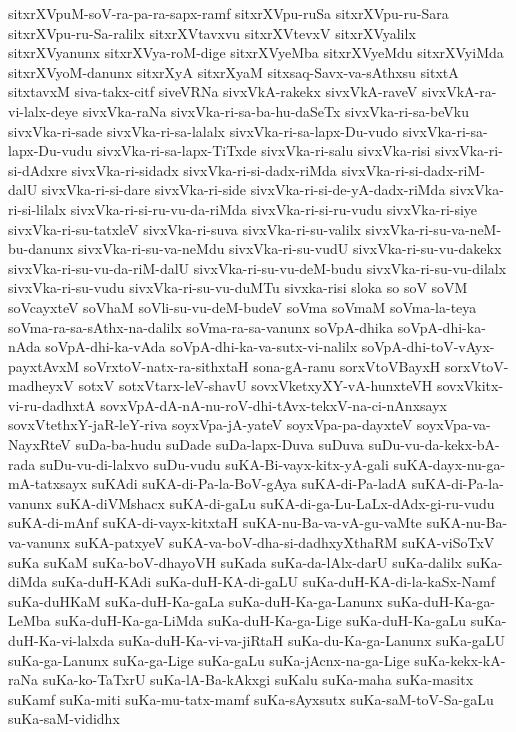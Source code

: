 {sitxrXVpuM-soV-ra-pa-ra-sapx-ramf
sitxrXVpu-ruSa
sitxrXVpu-ru-Sara
sitxrXVpu-ru-Sa-ralilx
sitxrXVtavxvu
sitxrXVtevxV
sitxrXVyalilx
sitxrXVyanunx
sitxrXVya-roM-dige
sitxrXVyeMba
sitxrXVyeMdu
sitxrXVyiMda
sitxrXVyoM-danunx
sitxrXyA
sitxrXyaM
sitxsaq-Savx-va-sAthxsu
sitxtA
sitxtavxM
siva-takx-citf
siveVRNa
sivxVkA-rakekx
sivxVkA-raveV
sivxVkA-ra-vi-lalx-deye
sivxVka-raNa
sivxVka-ri-sa-ba-hu-daSeTx
sivxVka-ri-sa-beVku
sivxVka-ri-sade
sivxVka-ri-sa-lalalx
sivxVka-ri-sa-lapx-Du-vudo
sivxVka-ri-sa-lapx-Du-vudu
sivxVka-ri-sa-lapx-TiTxde
sivxVka-ri-salu
sivxVka-risi
sivxVka-ri-si-dAdxre
sivxVka-ri-sidadx
sivxVka-ri-si-dadx-riMda
sivxVka-ri-si-dadx-riM-dalU
sivxVka-ri-si-dare
sivxVka-ri-side
sivxVka-ri-si-de-yA-dadx-riMda
sivxVka-ri-si-lilalx
sivxVka-ri-si-ru-vu-da-riMda
sivxVka-ri-si-ru-vudu
sivxVka-ri-siye
sivxVka-ri-su-tatxleV
sivxVka-ri-suva
sivxVka-ri-su-valilx
sivxVka-ri-su-va-neM-bu-danunx
sivxVka-ri-su-va-neMdu
sivxVka-ri-su-vudU
sivxVka-ri-su-vu-dakekx
sivxVka-ri-su-vu-da-riM-dalU
sivxVka-ri-su-vu-deM-budu
sivxVka-ri-su-vu-dilalx
sivxVka-ri-su-vudu
sivxVka-ri-su-vu-duMTu
sivxka-risi
sloka
so
soV
soVM
soVcayxteV
soVhaM
soVli-su-vu-deM-budeV
soVma
soVmaM
soVma-la-teya
soVma-ra-sa-sAthx-na-dalilx
soVma-ra-sa-vanunx
soVpA-dhika
soVpA-dhi-ka-nAda
soVpA-dhi-ka-vAda
soVpA-dhi-ka-va-sutx-vi-nalilx
soVpA-dhi-toV-vAyx-payxtAvxM
soVrxtoV-natx-ra-sithxtaH
sona-gA-ranu
sorxVtoVBayxH
sorxVtoV-madheyxV
sotxV
sotxVtarx-leV-shavU
sovxVketxyXY-vA-hunxteVH
sovxVkitx-vi-ru-dadhxtA
sovxVpA-dA-nA-nu-roV-dhi-tAvx-tekxV-na-ci-nAnxsayx
sovxVtethxY-jaR-leY-riva
soyxVpa-jA-yateV
soyxVpa-pa-dayxteV
soyxVpa-va-NayxRteV
suDa-ba-hudu
suDade
suDa-lapx-Duva
suDuva
suDu-vu-da-kekx-bA-rada
suDu-vu-di-lalxvo
suDu-vudu
suKA-Bi-vayx-kitx-yA-gali
suKA-dayx-nu-ga-mA-tatxsayx
suKAdi
suKA-di-Pa-la-BoV-gAya
suKA-di-Pa-ladA
suKA-di-Pa-la-vanunx
suKA-diVMshacx
suKA-di-gaLu
suKA-di-ga-Lu-LaLx-dAdx-gi-ru-vudu
suKA-di-mAnf
suKA-di-vayx-kitxtaH
suKA-nu-Ba-va-vA-gu-vaMte
suKA-nu-Ba-va-vanunx
suKA-patxyeV
suKA-va-boV-dha-si-dadhxyXthaRM
suKA-viSoTxV
suKa
suKaM
suKa-boV-dhayoVH
suKada
suKa-da-lAlx-darU
suKa-dalilx
suKa-diMda
suKa-duH-KAdi
suKa-duH-KA-di-gaLU
suKa-duH-KA-di-la-kaSx-Namf
suKa-duHKaM
suKa-duH-Ka-gaLa
suKa-duH-Ka-ga-Lanunx
suKa-duH-Ka-ga-LeMba
suKa-duH-Ka-ga-LiMda
suKa-duH-Ka-ga-Lige
suKa-duH-Ka-gaLu
suKa-duH-Ka-vi-lalxda
suKa-duH-Ka-vi-va-jiRtaH
suKa-du-Ka-ga-Lanunx
suKa-gaLU
suKa-ga-Lanunx
suKa-ga-Lige
suKa-gaLu
suKa-jAcnx-na-ga-Lige
suKa-kekx-kA-raNa
suKa-ko-TaTxrU
suKa-lA-Ba-kAkxgi
suKalu
suKa-maha
suKa-masitx
suKamf
suKa-miti
suKa-mu-tatx-mamf
suKa-sAyxsutx
suKa-saM-toV-Sa-gaLu
suKa-saM-vididhx
}

